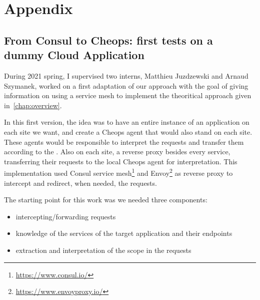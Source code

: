 \clearemptydoublepage
\part*{Appendix}
\label{p:appendix}


\chapter*{From Consul to Cheops: first tests on a dummy Cloud Application}
\label{chap:first-approach}



During 2021 spring, I supervised two interns, Matthieu Juzdzewski and Arnaud
Szymanek, worked on a first adaptation of our approach with the goal
of giving information on using a service mesh to implement the
theoritical approach given in~\autoref{chap:overview}.

In this first version, the idea was to have an entire instance of an
application on each site we want, and create a Cheops agent that would
also stand on each site.
%
These agents would be responsible to interpret the requests and
transfer them according to the \scl.
%
Also on each site, a reverse proxy besides every service, transferring
their requests to the local Cheops agent for interpretation.
%
%
This implementation used Consul service
mesh\footnote{\url{https://www.consul.io/}} and
Envoy\footnote{\url{https://www.envoyproxy.io/}} as reverse proxy to
intercept and redirect, when needed, the requests.
%

The starting point for this work was we needed three components:
\begin{itemize}
\item intercepting/forwarding requests
\item knowledge of the services of the target application and their
  endpoints
\item extraction and interpretation of the scope in the requests
\end{itemize}

